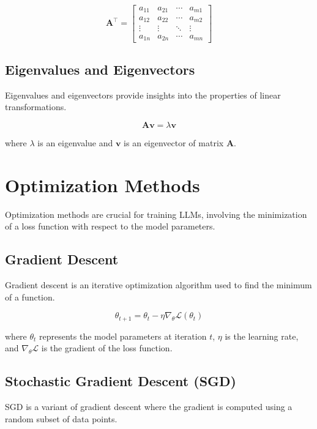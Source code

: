 \begin{equation}
\mathbf{A}^\top = \begin{bmatrix}
a_{11} & a_{21} & \cdots & a_{m1} \\
a_{12} & a_{22} & \cdots & a_{m2} \\
\vdots & \vdots & \ddots & \vdots \\
a_{1n} & a_{2n} & \cdots & a_{mn}
\end{bmatrix}
\end{equation}

\subsection{Eigenvalues and Eigenvectors}
Eigenvalues and eigenvectors provide insights into the properties of linear transformations.

\begin{equation}
\mathbf{A} \mathbf{v} = \lambda \mathbf{v}
\end{equation}

where \( \lambda \) is an eigenvalue and \( \mathbf{v} \) is an eigenvector of matrix \( \mathbf{A} \).

\section{Optimization Methods}
Optimization methods are crucial for training LLMs, involving the minimization of a loss function with respect to the model parameters.

\subsection{Gradient Descent}
Gradient descent is an iterative optimization algorithm used to find the minimum of a function.

\begin{equation}
\theta_{t+1} = \theta_t - \eta \nabla_\theta \mathcal{L}(\theta_t)
\end{equation}

where \( \theta_t \) represents the model parameters at iteration \( t \), \( \eta \) is the learning rate, and \( \nabla_\theta \mathcal{L} \) is the gradient of the loss function.

\subsection{Stochastic Gradient Descent (SGD)}
SGD is a variant of gradient descent where the gradient is computed using a random subset of data points.

